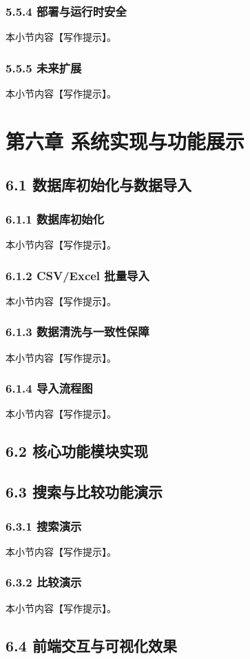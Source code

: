 \subsection{5.5.4 部署与运行时安全}
本小节内容【写作提示】。
\subsection{5.5.5 未来扩展}
本小节内容【写作提示】。

\chapter{第六章 系统实现与功能展示}
\section{6.1 数据库初始化与数据导入}
\subsection{6.1.1 数据库初始化}
本小节内容【写作提示】。
\subsection{6.1.2 CSV/Excel 批量导入}
本小节内容【写作提示】。
\subsection{6.1.3 数据清洗与一致性保障}
本小节内容【写作提示】。
\subsection{6.1.4 导入流程图}
本小节内容【写作提示】。
\section{6.2 核心功能模块实现}
\section{6.3 搜索与比较功能演示}
\subsection{6.3.1 搜索演示}
本小节内容【写作提示】。
\subsection{6.3.2 比较演示}
本小节内容【写作提示】。
\section{6.4 前端交互与可视化效果}
